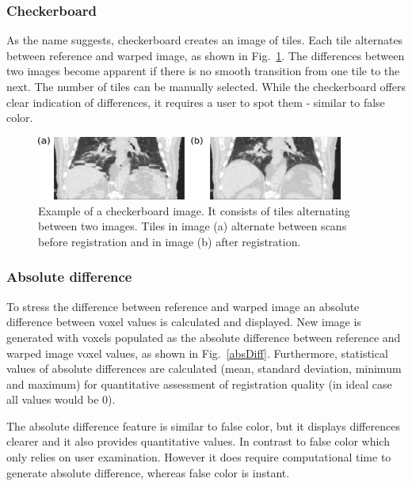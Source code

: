 \documentclass[type=dr, dr=rernat, accentcolor=tud7b,colorbacktitle, bigchapter, openright, twoside, 12pt ]{tudthesis}
\begin{document}
\subsubsection{Checkerboard}

As the name suggests, checkerboard creates an image of tiles. Each tile alternates between reference and warped image, as shown in Fig.~\ref{checkerboard}. The differences between two images become apparent if there is no smooth transition from one tile to the next. The number of tiles can be manually selected. While the checkerboard offers clear indication of differences, it requires a user to spot them - similar to false color.

\begin{figure}[H]
	\begin{center}		
		\includegraphics[width=0.9\textwidth]{./Images/checkerboard.png}
		\caption{Example of a checkerboard image. It consists of tiles alternating between two images. Tiles in image (a) alternate between scans before registration and in image (b) after registration.}
		\label{checkerboard}
	\end{center}
\end{figure}

\subsubsection{Absolute difference} 

To stress the difference between reference and warped image an absolute difference between voxel values is calculated and displayed. New image is generated with voxels populated as the absolute difference between reference and warped image voxel values, as shown in Fig.~\ref{absDiff}. Furthermore, statistical values of absolute differences are calculated (mean, standard deviation, minimum and maximum) for quantitative assessment of registration quality (in ideal case all values would be 0).

The absolute difference feature is similar to false color, but it displays differences clearer and it also provides quantitative values. In contrast to false color which only relies on user examination. However it does require computational time to generate absolute difference, whereas false color is instant.
\end{document}
